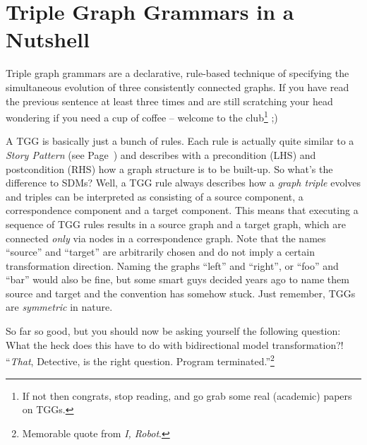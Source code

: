 \section{Triple Graph Grammars in a Nutshell}

Triple graph grammars are a declarative, rule-based technique of specifying the simultaneous evolution of three consistently connected graphs.
If you have read the previous sentence at least three times and are still scratching your head wondering if you need a cup of coffee -- welcome to the club\footnote{If not then congrats, stop reading, and go grab some real (academic) papers on TGGs.} ;)

A TGG is basically just a bunch of rules.
Each rule is actually quite similar to a \emph{Story Pattern} (see Page~\pageref{story-pattern}) and describes with a precondition (LHS) and postcondition (RHS) how a graph structure is to be built-up.
So what's the difference to SDMs?  
Well, a TGG rule always describes how a \emph{graph triple} evolves and triples can be interpreted as consisting of a source component, a correspondence component and a target component.
This means that executing a sequence of TGG rules results in a source graph and a target graph, which are connected \emph{only} via nodes in a correspondence graph.
Note that the names ``source'' and ``target'' are arbitrarily chosen and do not imply a certain transformation direction.
Naming the graphs ``left'' and ``right'', or ``foo'' and ``bar'' would also be fine, but some smart guys decided years ago to name them source and target and the convention has somehow stuck.
Just remember, TGGs are \emph{symmetric} in nature. 

So far so good, but you should now be asking yourself the following question: What the {\huge heck} does this have to do with bidirectional model transformation?!  ``\emph{That}, Detective, is the right question. Program terminated.''\footnote{Memorable quote from \emph{I, Robot}.}

